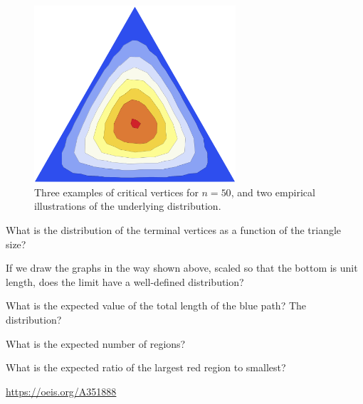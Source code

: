 \documentclass{article}
\begin{document}
\begin{figure}[ht!]
  \includegraphics[width=7.5cm]{assets/126_problem/ContourPlot2.png}
  \caption{
    Three examples of critical vertices for $n=50$, and two empirical illustrations of the underlying distribution.
  }
\end{figure}

\begin{question}
  What is the distribution of the terminal vertices as a function of the triangle size?
\end{question}

\begin{related}
  \item If we draw the graphs in the way shown above, scaled so that the bottom
  is unit length, does the limit have a well-defined distribution?
  \item What is the expected value of the total length of the blue path? The distribution?
  \item What is the expected number of regions?
  \item What is the expected ratio of the largest red region to smallest?
\end{related}

\begin{references}
  \item \url{https://oeis.org/A351888}
\end{references}
\end{document}
